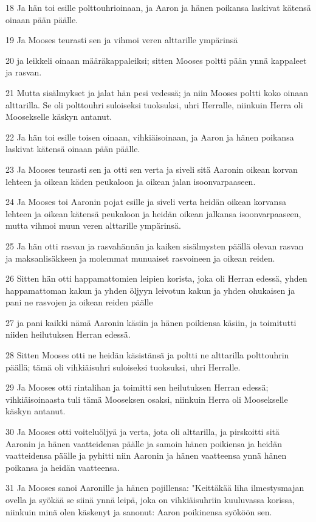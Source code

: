 \par 18 Ja hän toi esille polttouhrioinaan, ja Aaron ja hänen poikansa laskivat kätensä oinaan pään päälle.
\par 19 Ja Mooses teurasti sen ja vihmoi veren alttarille ympärinsä
\par 20 ja leikkeli oinaan määräkappaleiksi; sitten Mooses poltti pään ynnä kappaleet ja rasvan.
\par 21 Mutta sisälmykset ja jalat hän pesi vedessä; ja niin Mooses poltti koko oinaan alttarilla. Se oli polttouhri suloiseksi tuoksuksi, uhri Herralle, niinkuin Herra oli Moosekselle käskyn antanut.
\par 22 Ja hän toi esille toisen oinaan, vihkiäisoinaan, ja Aaron ja hänen poikansa laskivat kätensä oinaan pään päälle.
\par 23 Ja Mooses teurasti sen ja otti sen verta ja siveli sitä Aaronin oikean korvan lehteen ja oikean käden peukaloon ja oikean jalan isoonvarpaaseen.
\par 24 Ja Mooses toi Aaronin pojat esille ja siveli verta heidän oikean korvansa lehteen ja oikean kätensä peukaloon ja heidän oikean jalkansa isoonvarpaaseen, mutta vihmoi muun veren alttarille ympärinsä.
\par 25 Ja hän otti rasvan ja rasvahännän ja kaiken sisälmysten päällä olevan rasvan ja maksanlisäkkeen ja molemmat munuaiset rasvoineen ja oikean reiden.
\par 26 Sitten hän otti happamattomien leipien korista, joka oli Herran edessä, yhden happamattoman kakun ja yhden öljyyn leivotun kakun ja yhden ohukaisen ja pani ne rasvojen ja oikean reiden päälle
\par 27 ja pani kaikki nämä Aaronin käsiin ja hänen poikiensa käsiin, ja toimitutti niiden heilutuksen Herran edessä.
\par 28 Sitten Mooses otti ne heidän käsistänsä ja poltti ne alttarilla polttouhrin päällä; tämä oli vihkiäisuhri suloiseksi tuoksuksi, uhri Herralle.
\par 29 Ja Mooses otti rintalihan ja toimitti sen heilutuksen Herran edessä; vihkiäisoinaasta tuli tämä Mooseksen osaksi, niinkuin Herra oli Moosekselle käskyn antanut.
\par 30 Ja Mooses otti voiteluöljyä ja verta, jota oli alttarilla, ja pirskoitti sitä Aaronin ja hänen vaatteidensa päälle ja samoin hänen poikiensa ja heidän vaatteidensa päälle ja pyhitti niin Aaronin ja hänen vaatteensa ynnä hänen poikansa ja heidän vaatteensa.
\par 31 Ja Mooses sanoi Aaronille ja hänen pojillensa: "Keittäkää liha ilmestysmajan ovella ja syökää se siinä ynnä leipä, joka on vihkiäisuhriin kuuluvassa korissa, niinkuin minä olen käskenyt ja sanonut: Aaron poikinensa syököön sen.
